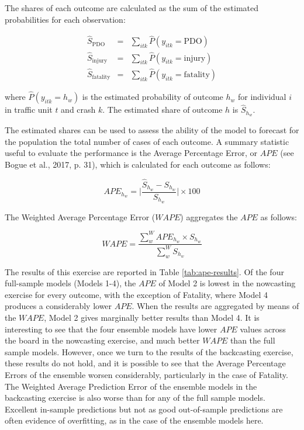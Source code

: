 \documentclass[]{elsarticle} %
\begin{document}
The shares of each outcome are calculated as the sum of the estimated
probabilities for each observation:

\begin{equation}
\label{eq:predicted-shares}
\begin{array}{rcl}
\hat{S}_{\text{PDO}} &=& \sum_{itk}\hat{P}(y_{itk}=\text{PDO})\\
\hat{S}_{\text{injury}} &=& \sum_{itk}\hat{P}(y_{itk}=\text{injury})\\
\hat{S}_{\text{fatality}} &=& \sum_{itk}\hat{P}(y_{itk}=\text{fatality})
\end{array}
\end{equation}

\noindent where \(\hat{P}(y_{itk}=h_w)\) is the estimated probability of
outcome \(h_w\) for individual \(i\) in traffic unit \(t\) and crash
\(k\). The estimated share of outcome \(h\) is \(\hat{S}_{h_w}\).

The estimated shares can be used to assess the ability of the model to
forecast for the population the total number of cases of each outcome. A
summary statistic useful to evaluate the performance is the Average
Percentage Error, or \(APE\) (see Bogue et al., 2017, p. 31), which is
calculated for each outcome as follows:

\begin{equation}
\label{eq:APE}
APE_{h_w} = \Bigg|\frac{\hat{S}_{h_w} - S_{h_w}}{S_{h_w}}\Bigg|\times 100
\end{equation}

The Weighted Average Percentage Error (\(WAPE\)) aggregates the \(APE\)
as follows:

\begin{equation}
\label{eq:WAPE}
WAPE = \frac{\sum_w^WAPE_{h_w}\times S_{h_w}}{\sum_w^WS_{h_w}}
\end{equation}

The results of this exercise are reported in Table
\ref{tab:ape-results}. Of the four full-sample models (Models 1-4), the
\(APE\) of Model 2 is lowest in the nowcasting exercise for every
outcome, with the exception of Fatality, where Model 4 produces a
considerably lower \(APE\). When the results are aggregated by means of
the \(WAPE\), Model 2 gives marginally better results than Model 4. It
is interesting to see that the four ensemble models have lower \(APE\)
values across the board in the nowcasting exercise, and much better
\(WAPE\) than the full sample models. However, once we turn to the
results of the backcasting exercise, these results do not hold, and it
is possible to see that the Average Percentage Errors of the ensemble
worsen considerably, particularly in the case of Fatality. The Weighted
Average Prediction Error of the ensemble models in the backcasting
exercise is also worse than for any of the full sample models. Excellent
in-sample predictions but not as good out-of-sample predictions are
often evidence of overfitting, as in the case of the ensemble models
here.
\end{document}
